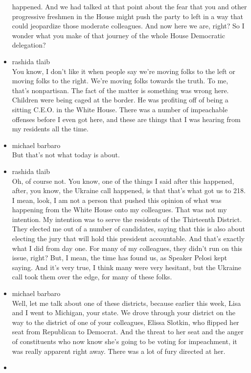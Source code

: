 \begin{itemize}
  happened. And we had talked at that point about the fear that you and
  other progressive freshmen in the House might push the party to left
  in a way that could jeopardize those moderate colleagues. And now here
  we are, right? So I wonder what you make of that journey of the whole
  House Democratic delegation?
\item
  rashida tlaib\\
  You know, I don't like it when people say we're moving folks to the
  left or moving folks to the right. We're moving folks towards the
  truth. To me, that's nonpartisan. The fact of the matter is something
  was wrong here. Children were being caged at the border. He was
  profiting off of being a sitting C.E.O. in the White House. There was
  a number of impeachable offenses before I even got here, and these are
  things that I was hearing from my residents all the time.
\item
  michael barbaro\\
  But that's not what today is about.
\item
  rashida tlaib\\
  Oh, of course not. You know, one of the things I said after this
  happened, after, you know, the Ukraine call happened, is that that's
  what got us to 218. I mean, look, I am not a person that pushed this
  opinion of what was happening from the White House onto my colleagues.
  That was not my intention. My intention was to serve the residents of
  the Thirteenth District. They elected me out of a number of
  candidates, saying that this is also about electing the jury that will
  hold this president accountable. And that's exactly what I did from
  day one. For many of my colleagues, they didn't run on this issue,
  right? But, I mean, the time has found us, as Speaker Pelosi kept
  saying. And it's very true, I think many were very hesitant, but the
  Ukraine call took them over the edge, for many of these folks.
\item
  michael barbaro\\
  Well, let me talk about one of these districts, because earlier this
  week, Lisa and I went to Michigan, your state. We drove through your
  district on the way to the district of one of your colleagues, Elissa
  Slotkin, who flipped her seat from Republican to Democrat. And the
  threat to her seat and the anger of constituents who now know she's
  going to be voting for impeachment, it was really apparent right away.
  There was a lot of fury directed at her.
\item

\end{itemize}
